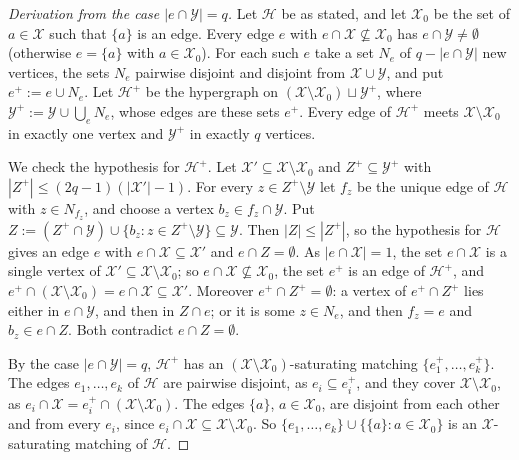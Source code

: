 \begin{proof}[Derivation from the case $|e\cap\mathcal Y|=q$]
Let $\mathcal H$ be as stated, and let $\mathcal X_0$ be the set of
$a\in\mathcal X$ such that $\{a\}$ is an edge. Every edge $e$ with
$e\cap\mathcal X\not\subseteq\mathcal X_0$ has $e\cap\mathcal Y\ne\emptyset$
(otherwise $e=\{a\}$ with $a\in\mathcal X_0$). For each such $e$ take a set
$N_e$ of $q-|e\cap\mathcal Y|$ new vertices, the sets $N_e$ pairwise disjoint
and disjoint from $\mathcal X\cup\mathcal Y$, and put $e^+:=e\cup N_e$. Let
$\mathcal H^+$ be the hypergraph on
$(\mathcal X\setminus\mathcal X_0)\sqcup\mathcal Y^+$, where
$\mathcal Y^+:=\mathcal Y\cup\bigcup_eN_e$, whose edges are these sets $e^+$.
Every edge of $\mathcal H^+$ meets $\mathcal X\setminus\mathcal X_0$ in exactly
one vertex and $\mathcal Y^+$ in exactly $q$ vertices.

We check the hypothesis for $\mathcal H^+$. Let
$\mathcal X'\subseteq\mathcal X\setminus\mathcal X_0$ and
$Z^+\subseteq\mathcal Y^+$ with $|Z^+|\le(2q-1)(|\mathcal X'|-1)$. For every
$z\in Z^+\setminus\mathcal Y$ let $f_z$ be the unique edge of $\mathcal H$ with
$z\in N_{f_z}$, and choose a vertex $b_z\in f_z\cap\mathcal Y$. Put
$Z:=(Z^+\cap\mathcal Y)\cup\{b_z:z\in Z^+\setminus\mathcal Y\}\subseteq\mathcal Y$.
Then $|Z|\le|Z^+|$, so the hypothesis for $\mathcal H$ gives an edge $e$ with
$e\cap\mathcal X\subseteq\mathcal X'$ and $e\cap Z=\emptyset$. As
$|e\cap\mathcal X|=1$, the set $e\cap\mathcal X$ is a single vertex of
$\mathcal X'\subseteq\mathcal X\setminus\mathcal X_0$; so
$e\cap\mathcal X\not\subseteq\mathcal X_0$, the set $e^+$ is an edge of
$\mathcal H^+$, and
$e^+\cap(\mathcal X\setminus\mathcal X_0)=e\cap\mathcal X\subseteq\mathcal X'$.
Moreover $e^+\cap Z^+=\emptyset$: a vertex of $e^+\cap Z^+$ lies either in
$e\cap\mathcal Y$, and then in $Z\cap e$; or it is some $z\in N_e$, and then
$f_z=e$ and $b_z\in e\cap Z$. Both contradict $e\cap Z=\emptyset$.

By the case $|e\cap\mathcal Y|=q$, $\mathcal H^+$ has an
$(\mathcal X\setminus\mathcal X_0)$-saturating matching
$\{e_1^+,\dots,e_k^+\}$. The edges $e_1,\dots,e_k$ of $\mathcal H$ are pairwise
disjoint, as $e_i\subseteq e_i^+$, and they cover
$\mathcal X\setminus\mathcal X_0$, as
$e_i\cap\mathcal X=e_i^+\cap(\mathcal X\setminus\mathcal X_0)$. The edges
$\{a\}$, $a\in\mathcal X_0$, are disjoint from each other and from every $e_i$,
since $e_i\cap\mathcal X\subseteq\mathcal X\setminus\mathcal X_0$. So
$\{e_1,\dots,e_k\}\cup\{\{a\}:a\in\mathcal X_0\}$ is an $\mathcal X$-saturating
matching of $\mathcal H$.
\end{proof}
